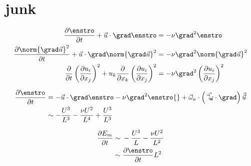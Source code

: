 \chapter{junk}



\begin{equation}\begin{split}
	\frac{\partial \enstro}{\partial t}
	+
	\vec{u} \cdot \grad \enstro
	&=
	-\nu \grad^{2} \enstro\\
	\frac{\partial \norm{\grad \vec{u}}^{2}}{\partial t}
	+
	\vec{u} \cdot \grad \norm{\grad \vec{u}}^{2}
	&=
	-\nu \grad^{2} \norm{\grad \vec{u}}^{2}\\
	\frac{\partial }{\partial t} \left(\frac{\partial u_{i}}{\partial x_{j}}\right)^{2}
	+
	u_{k}  \frac{\partial}{\partial x_{k}} \left(\frac{\partial u_{i}}{\partial x_{j}}\right)^{2}
	&=
	-\nu \grad^{2}  \left(\frac{\partial u_{i}}{\partial x_{j}}\right)^{2}\\
\end{split}\end{equation}


\begin{equation}\begin{split}
	\frac{\partial \enstro}{\partial t}
&=
	-
	\vec{u} \cdot \grad \enstro
	-\nu \grad^{2} \enstro{}
	+\vec{\omega}_{a}\cdot \left( \vec{\vec{\omega}_{a}} \cdot \grad \right) \vec{\vec{u}}\\
&\sim-
	\frac{U^{3}}{L^{3}}
	- \frac{\nu U^{2}}{L^{4}}
	+ \frac{U^{3}}{L^{3}}\\
\end{split}\end{equation}

\begin{equation}\begin{split}
	\frac{\partial E_{m}}{\partial t}
&\sim{}
-	\frac{U^{3}}{L}
	- \frac{\nu U^{2}}{L^{2}} \\
	&\sim
	\frac{\partial \enstro}{\partial t} L^{2}
\end{split}\end{equation}
